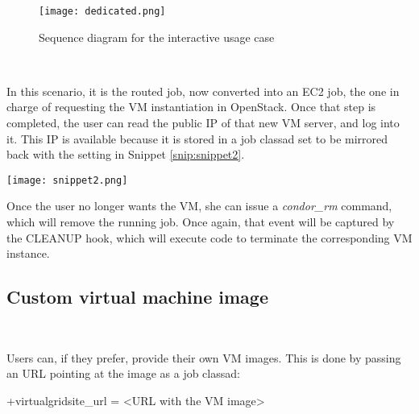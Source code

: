 \documentclass[a4paper]{jpconf}
\begin{document}
\begin{figure}[h]
    \centering
    \texttt{[image: dedicated.png]}
    \caption{Sequence diagram for the interactive usage case}
    \label{fig:interactive}
\end{figure}

~

In this scenario, it is the routed job, now converted into an EC2 job, 
the one in charge of requesting the VM instantiation in OpenStack.
Once that step is completed, the user can read the public IP of that new VM server, and log into it. 
This IP is available because it is stored in a job classad set to be mirrored back with the setting in Snippet \ref{snip:snippet2}.

\begin{snippet}[h]
    \centering
    \renewcommand\figurename{Snippet}
    \texttt{[image: snippet2.png]}
    \caption{Setup for a classad to be mirrored from the routed job to the source job.}
    \label{snip:snippet2}
\end{snippet}


Once the user no longer wants the VM, she can issue a \textit{condor\_rm}
command, which will remove the running job. 
Once again, that event will be captured by the CLEANUP hook, which will execute
code to terminate the corresponding VM instance.


\subsection{Custom virtual machine image}

~

Users can, if they prefer, provide their own VM images. 
This is done by passing an URL pointing at the image as a job classad:
\begin{center}
    +virtualgridsite\_url = \textless URL with the VM image\textgreater
\end{center}
\end{document}
